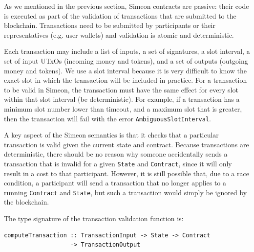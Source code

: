 \documentclass[english,runningheads]{llncs}
\begin{document}
As we mentioned in the previous section, Simeon
contracts are passive: their code is executed as part of the validation of
transactions that are submitted to the blockchain. Transactions
need to be submitted by participants or their representatives (e.g.
user wallets) and validation is atomic and deterministic.

Each transaction may include a list of inputs, a set of signatures,
a slot interval, a set of input UTxOs (incoming money and tokens), and a
set of outputs (outgoing money and tokens). We use a slot interval because
it is very difficult to know the exact slot in which the transaction will
be included in practice. For a transaction to be valid in Simeon, the
transaction must have the same effect for every slot within that slot
interval (be deterministic). For example, if a transaction has a minimum
slot number lower than timeout, and a maximum slot that is greater, then the transaction will fail with the error \texttt{AmbiguousSlotInterval}.

A key aspect of the Simeon semantics is that it checks that a particular
transaction is valid given the current state and contract. Because
transactions are deterministic, there should be no reason why someone
accidentally sends a transaction that is invalid for a given \texttt{State}
and \texttt{Contract}, since it will only result in a cost to that participant.
However, it is still possible that, due to a race condition, a participant will send a
transaction that no longer applies to a running \texttt{Contract} and
\texttt{State}, but such a transaction would simply be ignored by the
blockchain.

The type signature of the transaction validation function is:

\begin{verbatim}
computeTransaction :: TransactionInput -> State -> Contract
                   -> TransactionOutput 
\end{verbatim}
\end{document}
